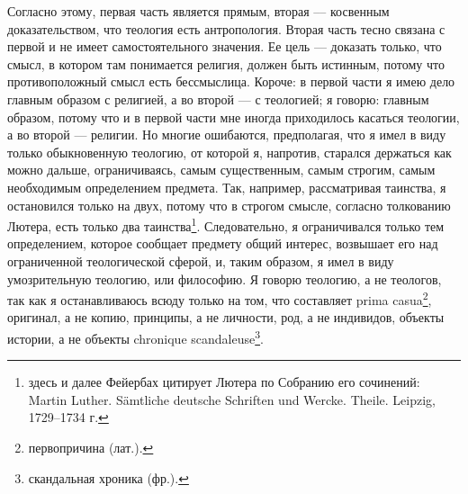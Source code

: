 \documentclass[12pt,oneside]{book}
\newcommand{\rom}[1]{\uppercase\expandafter{\romannumeral #1\relax}}
\begin{document}
Согласно этому, первая часть является прямым, вторая --– косвенным доказательством, что теология есть антропология. Вторая часть тесно связана с первой и не имеет самостоятельного значения. Ее цель --- доказать только, что смысл, в котором там понимается религия, должен быть истинным, потому что противоположный смысл есть бессмыслица. Короче: в первой части я имею дело главным образом с религией, а во второй --- с теологией; я говорю: главным образом, потому что и в первой части мне иногда приходилось касаться теологии, а во второй --- религии. Но многие ошибаются, предполагая, что я имел в виду только обыкновенную теологию, от которой я, напротив, старался держаться как можно дальше, ограничиваясь, самым существенным, самым строгим, самым необходимым определением предмета. Так, например, рассматривая таинства, я остановился только на двух, потому что в строгом смысле, согласно толкованию Лютера, есть только два таинства\footnote{здесь и далее Фейербах цитирует Лютера по Собранию его сочинений: Martin Luther. S\" amtliche deutsche Schriften und Wercke. \rom{22} Theile. Leipzig, 1729--1734 г.}. Следовательно, я ограничивался только тем определением, которое сообщает предмету общий интерес, возвышает его над ограниченной теологической сферой, и, таким образом, я имел в виду умозрительную теологию, или философию. Я говорю теологию, а не теологов, так как я останавливаюсь всюду только на том, что составляет prima casua\footnote{первопричина (лат.).}, оригинал, а не копию, принципы, а не личности, род, а не индивидов, объекты истории, а не объекты chronique scandaleuse\footnote{скандальная хроника (фр.).}.
\end{document}
